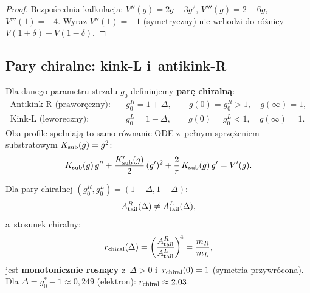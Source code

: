 \begin{proof}
Bezpo\'srednia kalkulacja: $V''(g) = 2g - 3g^2$, $V'''(g) = 2 - 6g$,
$V'''(1) = -4$. Wyraz $V''(1) = -1$ (symetryczny) nie wchodzi
do r\'o\.znicy $V(1{+}\delta) - V(1{-}\delta)$.
\end{proof}

\subsection{Pary chiralne: kink-L i~antikink-R}\label{app:K2-pary}

\begin{definition}\label{def:K2-chiral-pair}
Dla danego parametru strzału $g_0$ definiujemy \textbf{parę chiralną}:
\begin{align}
  \text{Antikink-R (praworęczny):} &\quad g_0^R = 1 + \Delta,
    \qquad g(0) = g_0^R > 1,\quad g(\infty) = 1, \label{eq:K2-right}\\
  \text{Kink-L (leworęczny):} &\quad g_0^L = 1 - \Delta,
    \qquad g(0) = g_0^L < 1,\quad g(\infty) = 1. \label{eq:K2-left}
\end{align}
Oba profile spe\l{}niaj\k{a} to samo r\'ownanie ODE
z~pe\l{}nym sprzę\.zeniem substratowym $K_{\rm sub}(g) = g^2$:
\begin{equation}\label{eq:K2-ODE}
  K_{\rm sub}(g)\,g''
  + \frac{K_{\rm sub}'(g)}{2}\,(g')^2
  + \frac{2}{r}\,K_{\rm sub}(g)\,g'
  = V'(g).
\end{equation}
\end{definition}

\begin{proposition}\label{prop:K2-Atail-asym}
Dla pary chiralnej $(g_0^R, g_0^L) = (1+\Delta, 1-\Delta)$:
\begin{equation}\label{eq:K2-Atail-ratio}
  A_{\rm tail}^R(\Delta) \neq A_{\rm tail}^L(\Delta),
\end{equation}
a~stosunek chiralny:
\begin{equation}\label{eq:K2-rchiral}
  r_{\rm chiral}(\Delta)
  = \left(\frac{A_{\rm tail}^R}{A_{\rm tail}^L}\right)^{\!4}
  = \frac{m_R}{m_L},
\end{equation}
jest \textbf{monotonicznie rosn\k{a}cy} z~$\Delta > 0$
i~$r_{\rm chiral}(0) = 1$ (symetria przywr\'ocona).
Dla $\Delta = g_0^* - 1 \approx 0{,}249$ (elektron):
$r_{\rm chiral} \approx 2{,}03$.
\end{proposition}

